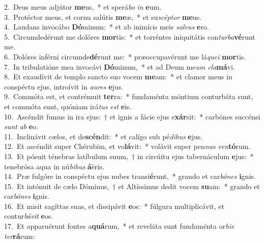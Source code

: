 {2.~}Deus meus adjútor \textbf{me}us,~* et sperá\textit{bo} \textit{in} \textbf{e}um.\\
{3.~}Protéctor meus, et cornu salútis \textbf{me}æ,~* et su\textit{scép}\textit{tor} \textbf{me}us.\\
{4.~}Laudans invocábo \textbf{Dó}minum:~* et ab inimícis meis \textit{sal}\textit{vus} \textbf{e}ro.\\
{5.~}Circumdedérunt me dolóres \textbf{mor}tis:~* et torréntes iniquitátis con\textit{tur}\textit{ba}\textbf{vé}runt me.\\
{6.~}Dolóres inférni circumde\textbf{dé}runt me:~* præoccupavérunt me lá\textit{que}\textit{i} \textbf{mor}tis.\\
{7.~}In tribulatióne mea invocávi \textbf{Dó}minum,~* et ad Deum me\textit{um} \textit{cla}\textbf{má}vi.\\
{8.~}Et exaudívit de templo sancto suo vocem \textbf{me}am:~* et clamor meus in conspéctu ejus, introívit in \textit{au}\textit{res} \textbf{e}jus.\\
{9.~}Commóta est, et contrémuit \textbf{ter}ra:~* fundaménta móntium conturbáta sunt, et commóta sunt, quóniam irá\textit{tus} \textit{est} \textbf{e}is.\\
{10.~}Ascéndit fumus in ira ejus:~† et ignis a fácie ejus e\textbf{xár}sit:~* carbónes succénsi \textit{sunt} \textit{ab} \textbf{e}o.\\
{11.~}Inclinávit cælos, et de\textbf{scén}dit:~* et calígo sub pé\textit{di}\textit{bus} \textbf{e}jus.\\
{12.~}Et ascéndit super Chérubim, et vo\textbf{lá}vit:~* volávit super pen\textit{nas} \textit{ven}\textbf{tó}rum.\\
{13.~}Et pósuit ténebras latíbulum suum,~† in circúitu ejus tabernáculum \textbf{e}jus:~* tenebrósa aqua in nú\textit{bi}\textit{bus} \textbf{á}ëris.\\
{14.~}Præ fulgóre in conspéctu ejus nubes transi\textbf{é}runt,~* grando et car\textit{bó}\textit{nes} \textbf{i}gnis.\\
{15.~}Et intónuit de cælo Dóminus,~† et Altíssimus dedit vocem \textbf{su}am:~* grando et car\textit{bó}\textit{nes} \textbf{i}gnis.\\
{16.~}Et misit sagíttas suas, et dissipávit \textbf{e}os:~* fúlgura multiplicávit, et contur\textit{bá}\textit{vit} \textbf{e}os.\\
{17.~}Et apparuérunt fontes a\textbf{quá}rum,~* et reveláta sunt fundaménta or\textit{bis} \textit{ter}\textbf{rá}rum:\\
